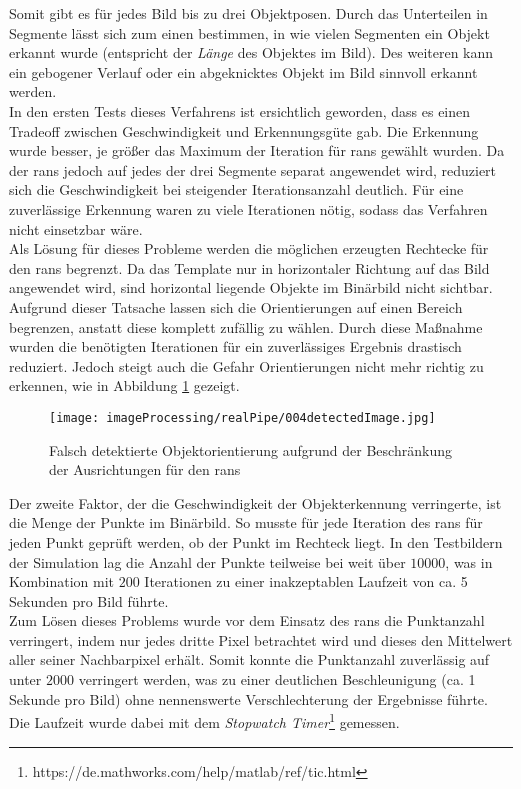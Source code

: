 Somit gibt es für jedes Bild bis zu drei Objektposen. Durch das Unterteilen in Segmente lässt sich zum einen bestimmen, in wie vielen Segmenten ein Objekt erkannt wurde (entspricht der \textit{Länge} des Objektes im Bild). Des weiteren kann ein gebogener Verlauf oder ein abgeknicktes Objekt im Bild sinnvoll erkannt werden.\\
In den ersten Tests dieses Verfahrens ist ersichtlich geworden, dass es einen Tradeoff zwischen Geschwindigkeit und Erkennungsgüte gab. Die Erkennung wurde besser, je größer das Maximum der Iteration für \gls{rans} gewählt wurden. Da der \gls{rans} jedoch auf jedes der drei Segmente separat angewendet wird, reduziert sich die Geschwindigkeit bei steigender Iterationsanzahl deutlich. Für eine zuverlässige Erkennung waren zu viele Iterationen nötig, sodass das Verfahren nicht einsetzbar wäre.\\
Als Lösung für dieses Probleme werden die möglichen erzeugten Rechtecke für den \gls{rans} begrenzt. Da das Template nur in horizontaler Richtung auf das Bild angewendet wird, sind horizontal liegende Objekte im Binärbild nicht sichtbar. Aufgrund dieser Tatsache lassen sich die Orientierungen auf einen Bereich begrenzen, anstatt diese komplett zufällig zu wählen. Durch diese Maßnahme wurden die benötigten Iterationen für ein zuverlässiges Ergebnis drastisch reduziert. Jedoch steigt auch die Gefahr Orientierungen nicht mehr richtig zu erkennen, wie in Abbildung \ref{detecFail} gezeigt.\\
\begin{figure}[H]
\centering
\texttt{[image: imageProcessing/realPipe/004detectedImage.jpg]}
\caption[Orientierung aufgrund von Beschränkung des \gls{rans} falsch detektiert]{Falsch detektierte Objektorientierung aufgrund der Beschränkung der Ausrichtungen für den \gls{rans}}
\label{detecFail}
\end{figure}
Der zweite Faktor, der die Geschwindigkeit der Objekterkennung verringerte, ist die Menge der Punkte im Binärbild. So musste für jede Iteration des \gls{rans} für jeden Punkt geprüft werden, ob der Punkt im Rechteck liegt. In den Testbildern der Simulation lag die Anzahl der Punkte teilweise bei weit über $10000$, was in Kombination mit $200$ Iterationen zu einer inakzeptablen Laufzeit von ca. 5 Sekunden pro Bild führte.\\
Zum Lösen dieses Problems wurde vor dem Einsatz des \gls{rans} die Punktanzahl verringert, indem nur jedes dritte Pixel betrachtet wird und dieses den Mittelwert aller seiner Nachbarpixel erhält.  Somit konnte die Punktanzahl zuverlässig auf unter $2000$ verringert werden, was zu einer deutlichen Beschleunigung (ca. 1 Sekunde pro Bild) ohne nennenswerte Verschlechterung der Ergebnisse führte. Die Laufzeit wurde dabei mit dem \matlab \textit{Stopwatch Timer}\footnote{https://de.mathworks.com/help/matlab/ref/tic.html} gemessen.
